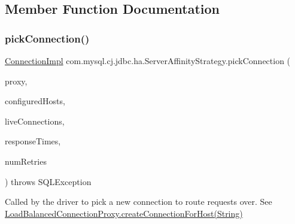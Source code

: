 \subsection{Member Function Documentation}
\mbox{\label{classcom_1_1mysql_1_1cj_1_1jdbc_1_1ha_1_1_server_affinity_strategy_adea6043b91b0a489e31de053e0f4cd25}} 
\subsubsection{\texorpdfstring{pick\+Connection()}{pickConnection()}}
{\footnotesize\ttfamily \mbox{\hyperlink{classcom_1_1mysql_1_1cj_1_1jdbc_1_1_connection_impl}{Connection\+Impl}} com.\+mysql.\+cj.\+jdbc.\+ha.\+Server\+Affinity\+Strategy.\+pick\+Connection (\begin{DoxyParamCaption}\item[{Invocation\+Handler}]{proxy,  }\item[{List$<$ String $>$}]{configured\+Hosts,  }\item[{Map$<$ String, \mbox{\hyperlink{interfacecom_1_1mysql_1_1cj_1_1jdbc_1_1_jdbc_connection}{Jdbc\+Connection}} $>$}]{live\+Connections,  }\item[{long \mbox{[}$\,$\mbox{]}}]{response\+Times,  }\item[{int}]{num\+Retries }\end{DoxyParamCaption}) throws S\+Q\+L\+Exception}

Called by the driver to pick a new connection to route requests over. See \mbox{\hyperlink{classcom_1_1mysql_1_1cj_1_1jdbc_1_1ha_1_1_load_balanced_connection_proxy_a27662d65e82acb86f3cc6af3f4f331ee}{Load\+Balanced\+Connection\+Proxy.\+create\+Connection\+For\+Host(\+String)}}


